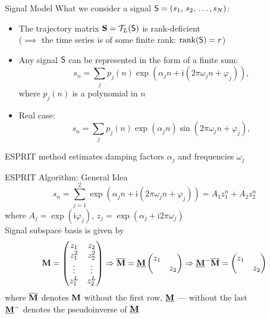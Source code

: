 \documentclass[pdf, unicode, ucs, notheorems]{beamer}
\theoremstyle{definition}
\begin{document}
\begin{frame}{Signal Model}
  What we consider a signal $\mathsf{S} = (s_1,\, s_2,\, \ldots, s_N)$:\smallskip
  \begin{itemize}
    \item The trajectory matrix $\mathbf{S} = \mathcal{T}_L(\mathsf{S})$ is rank-deficient \\
      ($\implies$ the time series is of some finite rank:
      $\operatorname{rank}(\mathsf{S})=r$)
      \medskip
    \item Any signal $\mathsf{S}$ can be represented in the form of a finite sum:
      \[
        s_n = \sum_{j} p_j(n) \exp(\alpha_j n + \mathrm{i}(2\pi
        \omega_j n + \varphi_j)),
      \]
      where $p_j(n)$ is a polynomial in $n$
      \medskip
    \item Real case:
      \[
        s_n = \sum_{j} p_j(n) \exp(\alpha_j n)\sin(2\pi
        \omega_j n + \varphi_j),
      \]
  \end{itemize}
  \bigskip
  ESPRIT method estimates damping factors $\alpha_j$ and
  frequencies $\omega_j$
\end{frame}

\begin{frame}{ESPRIT Algorithm: General Idea}
  \[
    s_n = \sum_{j=1}^{2} \exp(\alpha_j n + \mathrm{i}(2\pi
    \omega_j n + \varphi_j)) = A_1 z_1^n + A_2 z_2^n
  \]
  where $A_j = \exp(\mathrm{i} \varphi_j)$, $z_j = \exp(\alpha_j +
  \mathrm{i}2\pi\omega_j)$ \vspace{0.4cm}\\
  Signal subspace basis is given by
  \[
    \mathbf{M} =
    \begin{pmatrix}
      z_1 & z_2 \\
      z_1^2 & z_2^2\\
      \vdots & \vdots \\
      z_1^L & z_2^L
    \end{pmatrix} \Rightarrow \overline{\mathbf{M}} = \underline{\mathbf{M}}
    \begin{pmatrix}
      z_1 & \\ & z_2
    \end{pmatrix}\Rightarrow  \underline{\mathbf{M}}^{-}\overline{\mathbf{M}} =
    \begin{pmatrix}
      z_1 & \\ & z_2
    \end{pmatrix}
  \]
  where $\overline{\mathbf{M}}$ denotes $\mathbf{M}$ without the first row,
  $\underline{\mathbf{M}}$ --- without the last\\
  $\underline{\mathbf{M}}^{-}$ denotes the pseudoinverse of $\underline{\mathbf{M}}$
\end{frame}
\end{document}
